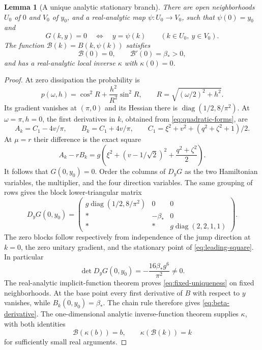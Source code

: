 \documentclass[11pt]{article}
\newtheorem{lemma}[theorem]{Lemma}
\theoremstyle{definition}
\theoremstyle{remark}
\DeclareMathOperator{\diag}{diag}
\begin{document}
\begin{lemma}[A unique analytic stationary branch]\label{lem:analytic-system}
There are open neighborhoods \(U_0\) of \(0\) and \(V_0\) of \(y_0\), and a real-analytic map \(\psi:U_0\to V_0\), such that \(\psi(0)=y_0\) and
\begin{equation}\label{eq:fixed-uniqueness}
 G(k,y)=0\quad\Longleftrightarrow\quad y=\psi(k)
 \qquad(k\in U_0,\ y\in V_0).
\end{equation}
The function \(\mathcal B(k)=B(k,\psi(k))\) satisfies
\begin{equation}\label{eq:beta-derivative}
 \mathcal B(0)=0,\qquad \mathcal B'(0)=\beta_*>0,
\end{equation}
and has a real-analytic local inverse \(\kappa\) with \(\kappa(0)=0\).
\end{lemma}
\begin{proof}
At zero dissipation the probability is
\[
 p(\omega,h)=\cos^2 R+\frac{h^2}{R^2}\sin^2 R,
 \qquad R=\sqrt{(\omega/2)^2+h^2}.
\]
Its gradient vanishes at \((\pi,0)\) and its Hessian there is
\(\diag(1/2,8/\pi^2)\). At \(\omega=\pi,h=0\), the first derivatives in \(k\), obtained from \eqref{eq:quadratic-forms}, are
\[
 A_k=C_1-4v/\pi,\qquad B_k=C_1+4v/\pi,
 \qquad C_1=\xi^2+v^2+(q^2+\zeta^2+1)/2.
\]
At \(\mu=r\) their difference is the exact square
\begin{equation}\label{eq:leading-square}
 A_k-rB_k=g\left(\xi^2+(v-1/\sqrt2)^2+\frac{q^2+\zeta^2}{2}\right).
\end{equation}
It follows that \(G(0,y_0)=0\). Order the columns of \(D_yG\) as the two Hamiltonian variables, the multiplier, and the four direction variables. The same grouping of rows gives the block lower-triangular matrix
\begin{equation}\label{eq:Jacobian}
 D_yG(0,y_0)=
 \begin{pmatrix}
 g\diag(1/2,8/\pi^2)&0&0\\
 *&-\beta_*&0\\
 *&*&g\diag(2,2,1,1)
 \end{pmatrix}.
\end{equation}
The zero blocks follow respectively from independence of the jump direction at \(k=0\), the zero unitary gradient, and the stationary point of \eqref{eq:leading-square}. In particular
\[
 \det D_yG(0,y_0)=-\frac{16\beta_*g^6}{\pi^2}\ne0.
\]
The real-analytic implicit-function theorem proves \eqref{eq:fixed-uniqueness} on fixed neighborhoods. At the base point every first derivative of \(B\) with respect to \(y\) vanishes, while \(B_k(0,y_0)=\beta_*\). The chain rule therefore gives \eqref{eq:beta-derivative}. The one-dimensional analytic inverse-function theorem supplies \(\kappa\), with both identities
\begin{equation}\label{eq:both-inverses}
 \mathcal B(\kappa(b))=b,\qquad \kappa(\mathcal B(k))=k
\end{equation}
for sufficiently small real arguments.
\end{proof}
\end{document}
